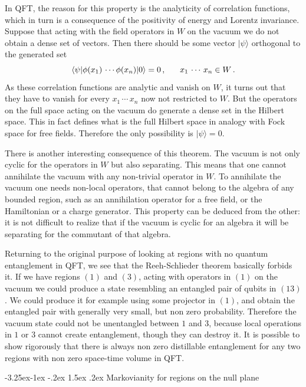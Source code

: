 \documentclass[11pt,a4paper]{article}
\makeatletter
\renewcommand\subsection{\@startsection{subsection}{2}{\z@}%
                                   {-3.25ex\@plus -1ex \@minus -.2ex}%
                                     {1.5ex \@plus .2ex}%
                                     {\normalfont\bfseries}}
\numberwithin{equation}{section}
\newcommand{\be}{\begin{equation}}
\newcommand{\ee}{\end{equation}}
\makeatother
\begin{document}
In QFT, the reason for this property is the analyticity of correlation functions, which in turn is a consequence of the positivity of energy and Lorentz invariance. Suppose that acting with the field operators in $W$ on the vacuum we do not obtain a dense set of vectors. Then there should be some vector $|\psi\rangle$ orthogonal to the generated set
\be 
\langle \psi|\phi(x_1)\,\cdots \phi(x_n) |0\rangle=0\,,\hspace{.6cm} x_1\,\cdots\,x_n\in W\,. 
 \ee
As these correlation functions are analytic and vanish on $W$, it turns out that they have to vanish for every $x_1\,\cdots\,x_n$ now not restricted to $W$. But the operators on the full space acting on the vacuum do generate a dense set in the Hilbert space. This in fact defines what is the full Hilbert space in analogy with Fock space for free fields. Therefore the only possibility is $|\psi\rangle=0$.   


There is another interesting consequence of this theorem. The vacuum is not only cyclic for the operators in $W$ but also separating. This means that one cannot annihilate the vacuum with any non-trivial operator in $W$. To annihilate the vacuum one needs non-local operators, that cannot belong to the algebra of any bounded region, such as an annihilation operator for a free field, or the Hamiltonian or a charge generator. This property can be deduced from the other: it is not difficult to realize that if the vacuum is cyclic for an algebra it will be separating for the commutant of that algebra.  
 
Returning to the original purpose of looking at regions with no quantum entanglement in QFT, we see that the Reeh-Schlieder theorem basically forbids it. If we have regions $(1)$ and $(3)$, acting with operators in $(1)$ on the vacuum we could produce a state resembling an entangled pair of qubits in $(13)$. We could produce it for example using some projector in $(1)$, and obtain the entangled pair with generally very small, but non zero probability. Therefore the vacuum state could not be unentangled between $1$ and $3$, because local operations in $1$ or $3$ cannot create entanglement, though they can destroy it. It is possible to show rigorously that there is always non zero distillable entanglement for any two regions with non zero space-time volume in QFT.



\subsection{Markovianity for regions on the null plane}
\end{document}
